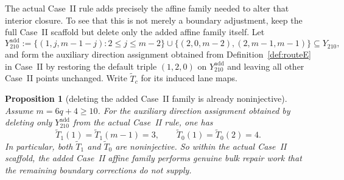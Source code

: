 \documentclass[11pt]{article}
\newtheorem{proposition}{Proposition}
\begin{document}
The actual Case~II rule adds precisely the affine family needed to alter that interior closure.
To see that this is not merely a boundary adjustment, keep the full Case~II scaffold but delete only the added affine family itself.
Let
\[
Y_{210}^{\mathrm{add}}
:=
\{(1,j,m-1-j):2\le j\le m-2\}\cup\{(2,0,m-2),(2,m-1,m-1)\}
\subseteq Y_{210},
\]
and form the auxiliary direction assignment obtained from Definition~\ref{def:routeE} in Case~II by restoring the default triple $(1,2,0)$ on $Y_{210}^{\mathrm{add}}$ and leaving all other Case~II points unchanged.
Write $\widetilde T_c$ for its induced lane maps.

\begin{proposition}[deleting the added Case~II family is already noninjective]\label{prop:boundary-no-go}
Assume $m=6q+4\ge 10$.
For the auxiliary direction assignment obtained by deleting only $Y_{210}^{\mathrm{add}}$ from the actual Case~II rule, one has
\[
\widetilde T_1(1)=\widetilde T_1(m-1)=3,
\qquad
\widetilde T_0(1)=\widetilde T_0(2)=4.
\]
In particular, both $\widetilde T_1$ and $\widetilde T_0$ are noninjective.
So within the actual Case~II scaffold, the added Case~II affine family performs genuine bulk repair work that the remaining boundary corrections do not supply.
\end{proposition}
\end{document}
